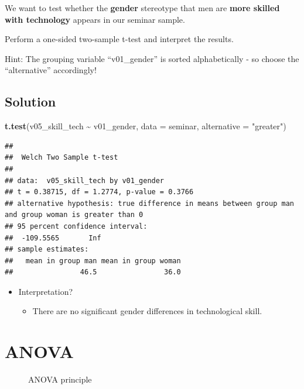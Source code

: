 \documentclass[
]{book}
\newenvironment{Shaded}{\begin{snugshade}}{\end{snugshade}}
\newcommand{\AttributeTok}[1]{\textcolor[rgb]{0.13,0.29,0.53}{#1}}
\newcommand{\FunctionTok}[1]{\textcolor[rgb]{0.13,0.29,0.53}{\textbf{#1}}}
\newcommand{\NormalTok}[1]{#1}
\newcommand{\SpecialCharTok}[1]{\textcolor[rgb]{0.81,0.36,0.00}{\textbf{#1}}}
\newcommand{\StringTok}[1]{\textcolor[rgb]{0.31,0.60,0.02}{#1}}
\providecommand{\tightlist}{%
  \setlength{\itemsep}{0pt}\setlength{\parskip}{0pt}}
\begin{document}
We want to test whether the \textbf{gender} stereotype that men are \textbf{more skilled with technology} appears in our seminar sample.

Perform a one-sided two-sample t-test and interpret the results.

Hint: The grouping variable ``v01\_gender'' is sorted alphabetically - so choose the ``alternative'' accordingly!

\subsection{\texorpdfstring{Solution }{Solution }}\label{solution-11}

\begin{Shaded}
\begin{Highlighting}[]
\FunctionTok{t.test}\NormalTok{(v05\_skill\_tech }\SpecialCharTok{\textasciitilde{}}\NormalTok{ v01\_gender, }\AttributeTok{data =}\NormalTok{ seminar, }\AttributeTok{alternative =} \StringTok{"greater"}\NormalTok{)}
\end{Highlighting}
\end{Shaded}

\begin{verbatim}
## 
##  Welch Two Sample t-test
## 
## data:  v05_skill_tech by v01_gender
## t = 0.38715, df = 1.2774, p-value = 0.3766
## alternative hypothesis: true difference in means between group man and group woman is greater than 0
## 95 percent confidence interval:
##  -109.5565       Inf
## sample estimates:
##   mean in group man mean in group woman 
##                46.5                36.0
\end{verbatim}

\begin{itemize}
\tightlist
\item
  Interpretation?

  \begin{itemize}
  \tightlist
  \item
    There are no significant gender differences in technological skill.
  \end{itemize}
\end{itemize}

\section{ANOVA}\label{anova}

\begin{figure}
\centering

\caption{ANOVA principle}
\end{figure}
\end{document}
